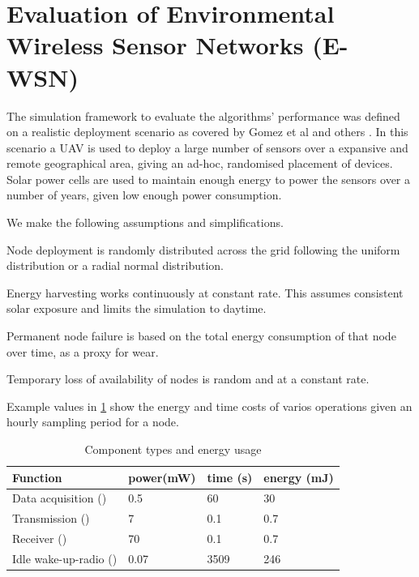 \section{Evaluation of Environmental Wireless Sensor Networks (E-WSN)}
\label{section:experimental}	

The simulation framework to evaluate the algorithms' performance was defined on a realistic deployment scenario as covered by Gomez et al \cite{Gomez} and others \cite{Jha2016, Avram}. In this scenario a UAV is used to deploy a large number of sensors over a expansive and remote geographical area, giving an ad-hoc, randomised placement of devices. Solar power cells are used to maintain enough energy to power the sensors over a number of years, given low enough power consumption. 

We make the following assumptions and simplifications.
\begin{itemize}{
		\item Node deployment is randomly distributed across the grid following the uniform distribution or a radial normal distribution.
		\item Energy harvesting works continuously at constant rate. This assumes consistent solar exposure and limits the simulation to daytime.
		\item Permanent node failure is based on the total energy consumption of that node over time, as a proxy for wear.
		\item Temporary loss of availability of nodes is random and at a constant rate.
	}
\end{itemize}

Example values in \ref{table:components_energy_usage} show the energy and time costs of varios operations given an hourly sampling period for a node.


\begin{table}[h]
	\begin{tabular}{p{}p{} p{} p{}}
		\hline
		Function & power(mW) & time (s) & energy (mJ)\\
		\hline
		Data acquisition (\symbolDataAcquisition{}{}) & 0.5 & 60 & 30 \\
		Transmission (\symbolTransmission{}{}) & 7 & 0.1 & 0.7 \\
		Receiver (\symbolReceiver{}{}) & 70 & 0.1 & 0.7 \\
		Idle wake-up-radio (\symbolWakeUpRadio{}{}) & 0.07 & 3509 & 246  \\
	\end{tabular}
	\caption{Component types and energy usage}
	\label{table:components_energy_usage}
\end{table}

